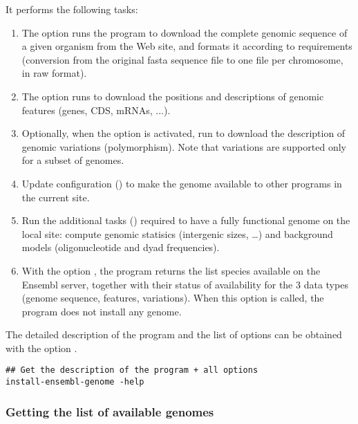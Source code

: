 It performs the following tasks: 
\begin{enumerate}

\item The option  runs the program
   to download the complete genomic
  sequence of a given organism from the \ensembl Web site, and formats
  it according to \RSAT requirements (conversion from the original
  fasta sequence file to one file per chromosome, in raw format).

\item The option  runs
   to download the positions and
  descriptions of genomic features (genes, CDS, mRNAs, ...).

\item Optionally, when the option  is
  activated, run  to download the
  description of genomic variations (polymorphism). Note that
  variations are supported only for a subset of genomes.

\item Update \RSAT configuration () to make the
  genome available to other programs in the current \RSAT site. 

\item Run the additional tasks () required to
  have a fully functional genome on the local \RSAT site: compute
  genomic statisics (intergenic sizes, \ldots) and background models
  (oligonucleotide and dyad frequencies).

\item With the option , the program
  returns the list species available on the Ensembl server, together
  with their status of availability for the 3 data types (genome
  sequence, features, variations). When this option is called, the
  program does not install any genome.

\end{enumerate}

The detailed description of the program and the list of options can be
obtained with the option .

\begin{lstlisting}
## Get the description of the program + all options
install-ensembl-genome -help
\end{lstlisting}

\subsubsection{Getting the list of available genomes}

